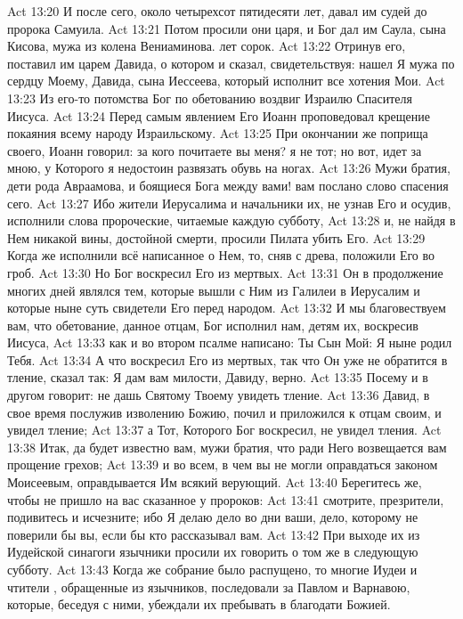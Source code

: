 \vs Act 13:20 И после сего, около четырехсот пятидесяти лет, давал им судей до пророка Самуила.
\vs Act 13:21 Потом просили они царя, и Бог дал им Саула, сына Кисова, мужа из колена Вениаминова.  лет сорок.
\vs Act 13:22 Отринув его, поставил им царем Давида, о котором и сказал, свидетельствуя: нашел Я мужа по сердцу Моему, Давида, сына Иессеева, который исполнит все хотения Мои.
\vs Act 13:23 Из его-то потомства Бог по обетованию воздвиг Израилю Спасителя Иисуса.
\vs Act 13:24 Перед самым явлением Его Иоанн проповедовал крещение покаяния всему народу Израильскому.
\vs Act 13:25 При окончании же поприща своего, Иоанн говорил: за кого почитаете вы меня? я не тот; но вот, идет за мною, у Которого я недостоин развязать обувь на ногах.
\vs Act 13:26 Мужи братия, дети рода Авраамова, и боящиеся Бога между вами! вам послано слово спасения сего.
\vs Act 13:27 Ибо жители Иерусалима и начальники их, не узнав Его и осудив, исполнили слова пророческие, читаемые каждую субботу,
\vs Act 13:28 и, не найдя в Нем никакой вины, достойной смерти, просили Пилата убить Его.
\vs Act 13:29 Когда же исполнили всё написанное о Нем, то, сняв с древа, положили Его во гроб.
\vs Act 13:30 Но Бог воскресил Его из мертвых.
\vs Act 13:31 Он в продолжение многих дней являлся тем, которые вышли с Ним из Галилеи в Иерусалим и которые ныне суть свидетели Его перед народом.
\vs Act 13:32 И мы благовествуем вам, что обетование, данное отцам, Бог исполнил нам, детям их, воскресив Иисуса,
\vs Act 13:33 как и во втором псалме написано: Ты Сын Мой: Я ныне родил Тебя.
\vs Act 13:34 А что воскресил Его из мертвых, так что Он уже не обратится в тление,  сказал так: Я дам вам милости,  Давиду, верно.
\vs Act 13:35 Посему и в другом  говорит: не дашь Святому Твоему увидеть тление.
\vs Act 13:36 Давид, в свое время послужив изволению Божию, почил и приложился к отцам своим, и увидел тление;
\vs Act 13:37 а Тот, Которого Бог воскресил, не увидел тления.
\vs Act 13:38 Итак, да будет известно вам, мужи братия, что ради Него возвещается вам прощение грехов;
\vs Act 13:39 и во всем, в чем вы не могли оправдаться законом Моисеевым, оправдывается Им всякий верующий.
\vs Act 13:40 Берегитесь же, чтобы не пришло на вас сказанное у пророков:
\vs Act 13:41 смотрите, презрители, подивитесь и исчезните; ибо Я делаю дело во дни ваши, дело, которому не поверили бы вы, если бы кто рассказывал вам.
\rsbpar\vs Act 13:42 При выходе их из Иудейской синагоги язычники просили их говорить о том же в следующую субботу.
\vs Act 13:43 Когда же собрание было распущено, то многие Иудеи и чтители , обращенные из язычников, последовали за Павлом и Варнавою, которые, беседуя с ними, убеждали их пребывать в благодати Божией.
